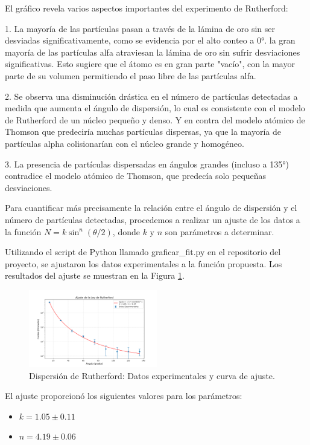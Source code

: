 \documentclass[twocolumn,a4paper,11pt]{scrartcl}
\begin{document}
El gráfico revela varios aspectos importantes del experimento de Rutherford:

1. La mayoría de las partículas pasan a través de la lámina de oro sin ser desviadas significativamente, como se evidencia por el alto conteo a 0°. la gran mayoría de las partículas alfa atraviesan la lámina de oro sin sufrir desviaciones significativas. Esto sugiere que el átomo es en gran parte "vacío", con la mayor parte de su volumen permitiendo el paso libre de las partículas alfa.

2. Se observa una disminución drástica en el número de partículas detectadas a medida que aumenta el ángulo de dispersión, lo cual es consistente con el modelo de Rutherford de un núcleo pequeño y denso. Y en contra del modelo atómico de Thomson que predeciría muchas partículas dispersas, ya que la mayoría de partículas alpha colisionarían con el núcleo grande y homogéneo.

3. La presencia de partículas dispersadas en ángulos grandes (incluso a 135°) contradice el modelo atómico de Thomson, que predecía solo pequeñas desviaciones.

Para cuantificar más precisamente la relación entre el ángulo de dispersión y el número de partículas detectadas, procedemos a realizar un ajuste de los datos a la función $N = k \sin^n (\theta/2)$, donde $k$ y $n$ son parámetros a determinar.

Utilizando el script de Python llamado graficar\_fit.py en el repositorio del proyecto, se ajustaron los datos experimentales a la función propuesta. Los resultados del ajuste se muestran en la Figura \ref{fig:rutherford_fit}.

\begin{figure}[h]
\centering
\includegraphics[width=0.5\textwidth]{data_fit.png}
\caption{Dispersión de Rutherford: Datos experimentales y curva de ajuste.}
\label{fig:rutherford_fit}
\end{figure}

El ajuste proporcionó los siguientes valores para los parámetros:

\begin{itemize}
    \item $k = 1.05 \pm 0.11$
    \item $n = 4.19 \pm 0.06$
\end{itemize}
\end{document}
